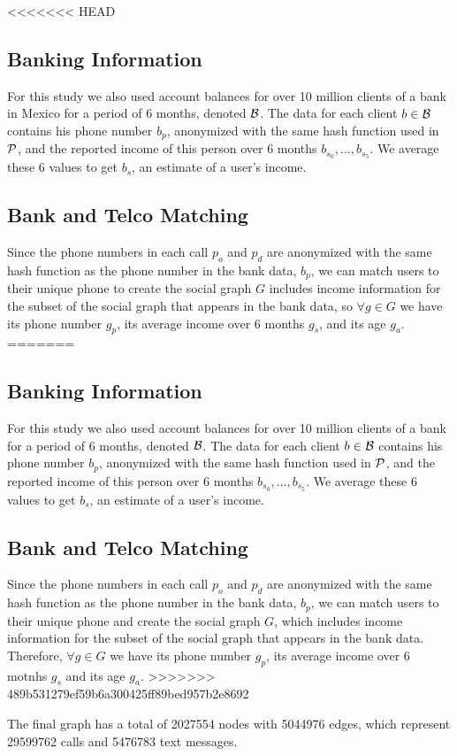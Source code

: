 <<<<<<< HEAD
\subsection{Banking Information}

For this study we also used account balances for over 10 million clients of a bank in Mexico for a period of 6 months, denoted $\mathcal{B}$. The data for each client $b \in \mathcal{B}$ contains his phone number $b_p$, anonymized with the same hash function used in $\mathcal{P}$, and the reported income of this person over 6 months $b_{s_0}, \ldots, b_{s_5}$. We average these 6 values to get $b_s$, an estimate of a user's income.

\subsection{Bank and Telco Matching}

Since the phone numbers in each call $p_o$ and $p_d$ are anonymized with the same hash function as the phone number in the bank data, $b_p$, we can match users to their unique phone to create the social graph $G$ includes income information for the subset of the social graph that appears in the bank data, so $\forall g \in G$ we have its phone number $g_p$,  its average income over 6 months $g_s$, and its age $g_a$.
=======

\subsection{Banking Information}

For this study we also used account balances for over 10 million clients of a bank for a period of 6 months, denoted $\mathcal{B}$. The data for each client $b \in \mathcal{B}$ contains his phone number $b_p$, anonymized with the same hash function used in $\mathcal{P}$, and the reported income of this person over 6 months $b_{s_0}, \ldots, b_{s_5}$. We average these 6 values to get $b_s$, an estimate of a user's income.

\subsection{Bank and Telco Matching}

Since the phone numbers in each call $p_o$ and $p_d$ are anonymized with the same hash function as the phone number in the bank data, $b_p$, we can match users to their unique phone and create the social graph $G$, which includes income information for the subset of the social graph that appears in the bank data. Therefore, $\forall g \in G$ we have its phone number $g_p$, its average income over 6 motnhs $g_s$ and its age $g_a$.
>>>>>>> 489b531279ef59b6a300425ff89bed957b2e8692

The final graph has a total of \num{2027554} nodes with \num{5044976} edges, which represent \num{29599762} calls and \num{5476783} text messages.
